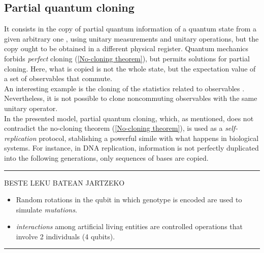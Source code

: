\documentclass[11pt]{article}
\numberwithin{equation}{section} %
\numberwithin{figure}{section} %
\begin{document}
\begin{appendices}
\subsection{Partial quantum cloning} \label{partial_quantum_cloning}

	It consists in the copy of partial quantum information of a quantum state from a given arbitrary one \cite[p.~1, l.~15-16]{Bio_Cloning}, using unitary measurements and unitary operations, but the copy ought to be obtained in a different physical register. Quantum mechanics forbids \emph{perfect} cloning (\ref{No-cloning theorem}), but permits solutions for partial cloning. Here, what is copied is not the whole state, but the expectation value of a set of observables that commute.\\
	
	An interesting example is the cloning of the statistics related to observables \cite{Ferraro}. Nevertheless, it is not possible to clone noncommuting observables with the same unitary operator.\\

In the presented model, partial quantum cloning, which, as mentioned, does not contradict the no-cloning theorem (\ref{No-cloning theorem}), is used as a \emph{self-replication} protocol, stablishing a powerful simile with what happens in biological systems. For instance, in DNA replication, information is not perfectly duplicated into the following generations, only sequences of bases are copied. \cite[p.~1, l.~25-28]{Bio_Cloning}\\

\noindent
{\color{red} \rule{\linewidth}{0.5mm} }
BESTE LEKU BATEAN JARTZEKO
\begin{itemize}
\item Random rotations in the qubit in which genotype is encoded are used to simulate \emph{mutations}.
\item \emph{interactions} among artificial living entities are controlled operations that involve 2 individuals (4 qubits).
\end{itemize}
\noindent
{\color{red} \rule{\linewidth}{0.5mm} }

\newpage

\section{}


\end{appendices}
\end{document}
